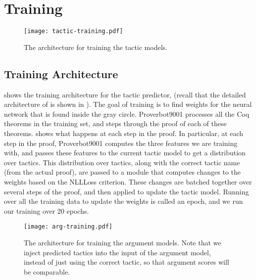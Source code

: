 \documentclass[sigplan,screen]{acmart}
\newcommand{\name}{Proverbot9001\xspace}
\renewcommand{\>}{\quad}
\begin{document}
\section{Training}

\begin{figure}
\texttt{[image: tactic-training.pdf]}
\caption{The architecture for training the tactic models.}
\label{fig:tactic-training}
\end{figure}
\subsection{Training Architecture}
 shows the training architecture for the tactic predictor,  (recall that the detailed architecture of  is shown in ).
The goal of training is to find weights for the neural network that is found inside the gray  circle.
\name{} processes all the Coq theorems in the training set, and steps through the proof of each of these theorems.
 shows what happens at each step in the proof.
In particular, at each step in the proof, \name{} computes the three features we are training with, and passes these features to the current tactic model to get a distribution over tactics.
This distribution over tactics, along with the correct tactic name (from the actual proof), are passed to a module that computes changes to the weights based on the NLLLoss criterion.
These changes are batched together over several steps of the proof, and then applied to update the tactic model.
Running over all the training data to update the weights is called an epoch, and we run our training over 20 epochs.

\begin{figure}
\texttt{[image: arg-training.pdf]}
\caption{The architecture for training the argument
  models. Note that we inject predicted tactics into the input of
  the argument model, instead of just using the correct tactic,
  so that argument scores will be comparable.}
\label{fig:arg-training}
\end{figure}
\end{document}
